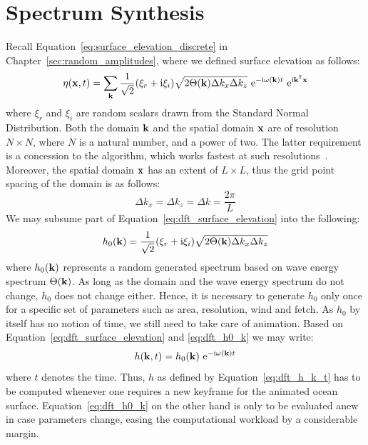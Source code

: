 \section{Spectrum Synthesis}
\label{sec:spectrum_synthesis}
Recall Equation~\ref{eq:surface_elevation_discrete} in Chapter~\ref{sec:random_amplitudes},
where we defined surface elevation as follows:
\begin{equation}
\label{eq:dft_surface_elevation}
\eta(\mathbf{x}, t) = 
\sum_{\mathbf{k}}\frac{1}{\sqrt{2}}(\xi_r+\mathrm{i}\xi_i)
\sqrt{2\Theta(\mathbf{k})\Delta k_x \Delta k_z} 
~\mathrm{e}^{-\mathrm{i}\omega(\mathbf{k})t}
~\mathrm{e}^{\mathrm{i}\mathbf{k}^{\mathsf{T}}\mathbf{x}}
\end{equation}
where $\xi_r$ and $\xi_i$ are random scalars drawn from the Standard Normal
Distribution. Both the \wavevector domain $\mathbf{k}$ and the
spatial domain $\mathbf{x}$ are of resolution $N \times N$, where $N$ is a natural
number, and a power of two. The latter requirement is a concession to
the \FastFourierTransform algorithm, which works fastest at such
resolutions~\citep{Cooley:1965}.
Moreover, the spatial domain $\mathbf{x}$ has an extent of $L \times L$, thus the
grid point spacing of the \wavevector domain is as follows:
\begin{equation*}
	\Delta k_x = \Delta k_z = \Delta k = \frac{2\pi}{L}
\end{equation*}
We may subsume part of Equation~\ref{eq:dft_surface_elevation} into the
following:
\begin{equation}
\label{eq:dft_h0_k}
h_0(\mathbf{k}) = \frac{1}{\sqrt{2}}(\xi_r+\mathrm{i}\xi_i)\sqrt{2\Theta(\mathbf{k})\Delta k_x \Delta k_z}
\end{equation}
where $h_0(\mathbf{k})$ represents a random generated spectrum based on wave
energy spectrum $\Theta(\mathbf{k})$. As long as the \wavevector domain and the
wave energy spectrum do not change, $h_0$ does not change either. Hence, it is
necessary to generate $h_0$ only once for a specific set of parameters such as
area, resolution, wind and fetch. As $h_0$ by itself has no notion of time,
we still need to take care of animation. Based on Equation~\ref{eq:dft_surface_elevation}
and \ref{eq:dft_h0_k} we may write:
\begin{equation}
\label{eq:dft_h_k_t}
h(\mathbf{k},t) = h_0(\mathbf{k})~\mathrm{e}^{-\mathrm{i}\omega(\mathbf{k})t}
\end{equation}
where $t$ denotes the time.
Thus, $h$ as defined by Equation~\ref{eq:dft_h_k_t} has to be computed whenever
one requires a new keyframe for the animated ocean surface.
Equation~\ref{eq:dft_h0_k} on the other hand is only to be evaluated anew in
case parameters change, easing the computational workload by a
considerable margin.

